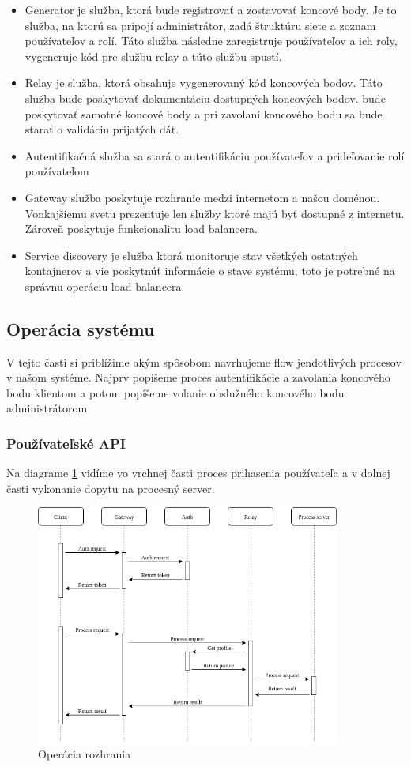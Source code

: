 \begin{itemize}
\item Generator je služba, ktorá bude registrovať a zostavovať koncové body. Je to služba, na ktorú sa pripojí administrátor, zadá štruktúru siete a zoznam používateľov a rolí. Táto služba následne zaregistruje používateľov a ich roly, vygeneruje kód pre službu relay a túto službu spustí.
\item Relay je služba, ktorá obsahuje vygenerovaný kód koncových bodov. Táto služba bude poskytovať dokumentáciu dostupných koncových bodov. bude poskytovať samotné koncové body a pri zavolaní koncového bodu sa bude starať o validáciu prijatých dát.
\item Autentifikačná služba sa stará o autentifikáciu používateľov a prideľovanie rolí používateľom
\item Gateway služba poskytuje rozhranie medzi internetom a našou doménou. Vonkajšiemu svetu prezentuje len služby ktoré majú byť dostupné z internetu. Zároveň poskytuje funkcionalitu load balancera.
\item Service discovery je služba ktorá monitoruje stav všetkých ostatných kontajnerov a vie poskytnúť informácie o stave systému, toto je potrebné na správnu operáciu load balancera.
\end{itemize}


\subsection{Operácia systému}
V tejto časti si priblížime akým spôsobom navrhujeme flow jendotlivých procesov v našom systéme. Najprv popíšeme proces autentifikácie a zavolania koncového bodu klientom a potom popíšeme volanie obslužného koncového bodu administrátorom
\subsubsection{Používateľské API}
Na diagrame \ref{api_operation} vidíme vo vrchnej časti proces prihasenia používateľa a v dolnej časti vykonanie dopytu na procesný server.


\begin{figure}[!htbp]
	\centering
	\includegraphics[width=10cm]{img/api_operation.png}
	\caption{Operácia rozhrania}
	\label{api_operation}
\end{figure}


